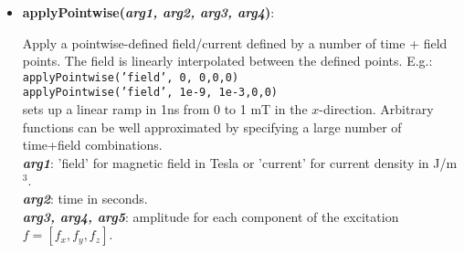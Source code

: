\begin{itemize}
%

 \item {\vspace{-0.4cm}\textbf{applyPointwise(\textit{arg1, arg2, arg3, arg4})}: 
				\flushright\parbox{0.9 \textwidth}{\vspace{-0.25cm} 
				Apply a pointwise-defined field/current defined by a number of time + field points.  The field is linearly interpolated between the defined points.	E.g.:\\ 
				\qquad\texttt{applyPointwise('field', 0, 0,0,0)}\\
				\qquad\texttt{applyPointwise('field', 1e-9, 1e-3,0,0)} \\
				sets up a linear ramp in 1ns from 0 to 1 mT in the $x$-direction.  Arbitrary functions can be well approximated by specifying a large number of time+field combinations.\\
				\textbf{\textit{arg1}}: 'field' for magnetic field in Tesla or 'current' for current density in J/m$^3$.\\
				\textbf{\textit{arg2}}: time in seconds.\\
				\textbf{\textit{arg3, arg4, arg5}}: amplitude for each component of the excitation $f = [f_x, f_y, f_z]$.
				}\flushleft}


\end{itemize}
